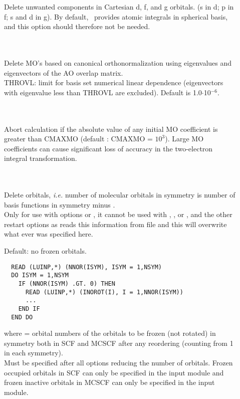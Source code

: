 \begin{description}
\item[]
  Delete unwanted components in Cartesian d, f, and g orbitals.
  (s in d; p in f; s and d in g). By default, \her\ provides atomic
  integrals in spherical basis, and this option should therefore not
  be needed.

\item[] \ \\
   \\
  Delete MO's based on canonical orthonormalization using eigenvalues
  and eigenvectors of the AO overlap matrix. \\
  THROVL: limit for basis
  set numerical linear dependence (eigenvectors with eigenvalue less
  than THROVL are excluded). Default is 1.0$\cdot$10$^{-6}$.

\item[] \ \\
   \\
  Abort calculation if the absolute value of any initial MO coefficient is
  greater than CMAXMO (default : CMAXMO = $10^3$).  Large MO coefficients
  can cause significant loss of accuracy in the two-electron integral
  transformation.

\item[] \ \\
   \\
  Delete orbitals, {\it i.e.\/} number of molecular orbitals
  in symmetry  is number of basis functions in symmetry  minus
  . \\
  Only for use with  options  or , 
  it cannot be used with , , or ,
  and the other restart options as  reads this information from file
  and this will overwrite what ever was specified here.

\item[]
  Default: no frozen orbitals.
\begin{verbatim}
  READ (LUINP,*) (NNOR(ISYM), ISYM = 1,NSYM)
  DO ISYM = 1,NSYM
    IF (NNOR(ISYM) .GT. 0) THEN
      READ (LUINP,*) (INOROT(I), I = 1,NNOR(ISYM))
      ...
    END IF
  END DO
\end{verbatim}
  where  = orbital numbers of the orbitals to be
          frozen (not rotated)
          in symmetry  both in SCF and MCSCF
          after any reordering (counting from 1 in each symmetry).\\
  Must be specified after all options reducing the number of orbitals.
  Frozen occupied orbitals in SCF can only be specified in the  input module
  and frozen inactive orbitals in MCSCF can only be specified in the 
  input module.


\end{description}
